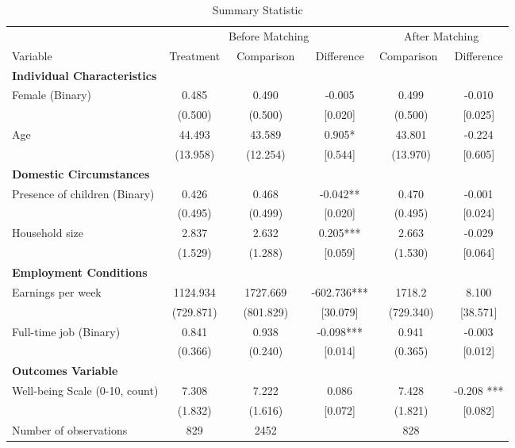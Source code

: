 \documentclass[12pt]{article}
\renewcommand{\arraystretch}{1.0} %
\begin{document}
\begin{table}[htbp]
\renewcommand{\arraystretch}{0.85}
\setlength{\tabcolsep}{0.1mm}
  \centering
  \caption{Summary Statistic} \label{SumStat}
{\small
    \begin{tabular}{lccccc}
\toprule
          & \multicolumn{3}{c}{Before Matching} & \multicolumn{2}{c}{After Matching} \\
          \cmidrule(r){2-4} \cmidrule(l){5-6}
    Variable & Treatment & ~Comparison~ & Difference & Comparison~ & Difference \\
          \midrule \midrule
    \textbf{Individual Characteristics} &       &       &       &       &  \\
    Female (Binary) & 0.485 & 0.490 & -0.005 & 0.499 & -0.010\\
          & (0.500) & (0.500) & [0.020] & (0.500) & [0.025]\\
    Age  & 44.493 & 43.589 & 0.905* & 43.801 & -0.224\\
         & (13.958) & (12.254) & [0.544] & (13.970) & [0.605]\\
          \midrule
    \textbf{Domestic Circumstances} &       &       &       &       &  \\
    Presence of children (Binary) & 0.426 & 0.468 & -0.042** & 0.470 & -0.001 \\
          & (0.495) & (0.499) & [0.020] & (0.495) & [0.024]\\
    Household size & 2.837 & 2.632 & 0.205*** & 2.663 & -0.029\\
          & (1.529) & (1.288) & [0.059] & (1.530) &[0.064] \\
          \midrule
    \textbf{Employment Conditions } &       &       &       &       &  \\
    Earnings per week & 1124.934 & 1727.669 & -602.736*** & 1718.2 & 8.100 \\
          & (729.871) & (801.829) & [30.079] & (729.340) & [38.571] \\
    Full-time job (Binary) & 0.841 & 0.938 & -0.098*** & 0.941 & -0.003 \\
          & (0.366) & (0.240) & [0.014] & (0.365) &  [0.012] \\
          \midrule
    \multicolumn{6}{l}{\textbf{Outcomes Variable}}  \\
    Well-being Scale (0-10, count) & 7.308 & 7.222 & 0.086 & 7.428 & -0.208 ***\\
& (1.832) & (1.616) & [0.072] &(1.821)& [0.082]\\
          \midrule \midrule
    Number of observations &  829     &   2452    &       &  828     &  \\
\bottomrule
    \end{tabular}%
}
  \label{tab:t1}%
\end{table}%
\end{document}
